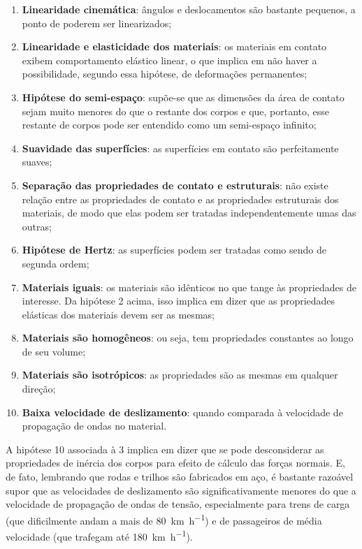 \begin{enumerate}
    \item \textbf{Linearidade cinemática}: ângulos e deslocamentos são bastante pequenos, a ponto de poderem ser linearizados;
    \item \textbf{Linearidade e elasticidade dos materiais}: os materiais em contato exibem comportamento elástico linear, o 
    que implica em não haver a possibilidade, segundo essa hipótese, de deformações permanentes;
    \item \textbf{Hipótese do semi-espaço}: supõe-se que as dimensões da área de contato sejam muito menores do que o restante dos
    corpos e que, portanto, esse restante de corpos pode ser entendido como um semi-espaço infinito;
    \item \textbf{Suavidade das superfícies}: as superfícies em contato são perfeitamente suaves;
    \item \textbf{Separação das propriedades de contato e estruturais}: não existe relação entre as propriedades de contato
    e as propriedades estruturais dos materiais, de modo que elas podem ser tratadas independentemente umas das outras;
    \item \textbf{Hipótese de Hertz}: as superfícies podem ser tratadas como sendo de segunda ordem;
    \item \textbf{Materiais iguais}: os materiais são idênticos no que tange às propriedades de interesse. Da hipótese 2 acima, isso
    implica em dizer que as propriedades elásticas dos materiais devem ser as mesmas;
    \item \textbf{Materiais são homogêneos}: ou seja, tem propriedades constantes ao longo de seu volume;
    \item \textbf{Materiais são isotrópicos}: as propriedades são as mesmas em qualquer direção;
    \item \textbf{Baixa velocidade de deslizamento}: quando comparada à velocidade de propagação de ondas no material.
\end{enumerate}

A hipótese 10 associada à 3 implica em dizer que se pode desconsiderar as propriedades de inércia dos corpos para efeito
de cálculo das forças normais. E, de fato, lembrando que rodas e trilhos são fabricados em aço, é bastante razoável supor
que as velocidades de deslizamento são significativamente menores do que a velocidade de propagação de ondas de tensão, especialmente
para trens de carga (que dificilmente andam a mais de \SI{80}{\kilo\meter\per\hour}) e de passageiros de média velocidade (que trafegam até \SI{180}{\kilo\meter\per\hour}).

